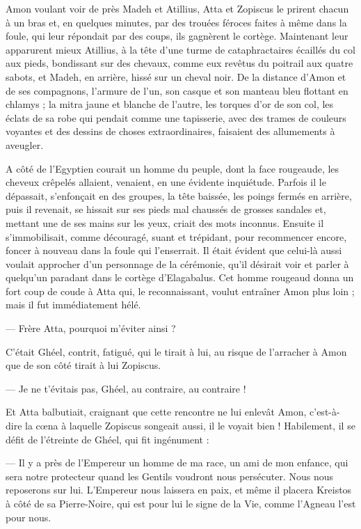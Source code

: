 \documentclass[a4paper, 11pt, oneside, polutonikogreek, french]{article}
\begin{document}
Amon voulant voir de près Madeh et Atillius, Atta et Zopiscus le prirent chacun à un bras et, en quelques minutes, par des trouées féroces faites à même dans la foule, qui leur répondait par des coups, ils gagnèrent le cortège. Maintenant leur apparurent mieux Atillius, à la tête d'une turme de cataphractaires écaillés du col aux pieds, bondissant sur des chevaux, comme eux revêtus du poitrail aux quatre sabots, et Madeh, en arrière, hissé sur un cheval noir. De la distance d'Amon et de ses compagnons, l'armure de l'un, son casque et son manteau bleu flottant en chlamys ; la mitra jaune et blanche de l'autre, les torques d'or de son col, les éclats de sa robe qui pendait comme une tapisserie, avec des trames de couleurs voyantes et des dessins de choses extraordinaires, faisaient des allumements à aveugler.

A côté de l'Egyptien courait un homme du peuple, dont la face rougeaude, les cheveux crêpelés allaient, venaient, en une évidente inquiétude. Parfois il le dépassait, s'enfonçait en des groupes, la tête baissée, les poings fermés en arrière, puis il revenait, se hissait sur ses pieds mal chaussés de grosses sandales et, mettant une de ses mains sur les yeux, criait des mots inconnus. Ensuite il s'immobilisait, comme découragé, suant et trépidant, pour recommencer encore, foncer à nouveau dans la foule qui l'enserrait. Il était évident que celui-là aussi voulait approcher d'un personnage de la cérémonie, qu'il désirait voir et parler à quelqu'un paradant dans le cortège d'Elagabalus. Cet homme rougeaud donna un fort coup de coude à Atta qui, le reconnaissant, voulut entraîner Amon plus loin ; mais il fut immédiatement hélé.

--- Frère Atta, pourquoi m'éviter ainsi ?

C'était Ghéel, contrit, fatigué, qui le tirait à lui, au risque de l'arracher à Amon que de son côté tirait à lui Zopiscus.

--- Je ne t'évitais pas, Ghéel, au contraire, au contraire !

Et Atta balbutiait, craignant que cette rencontre ne lui enlevât Amon, c'est-à-dire la cœna à laquelle Zopiscus songeait aussi, il le voyait bien ! Habilement, il se défit de l'étreinte de Ghéel, qui fit ingénument :

--- Il y a près de l'Empereur un homme de ma race, un ami de mon enfance, qui sera notre protecteur quand les Gentils voudront nous persécuter. Nous nous reposerons sur lui. L'Empereur nous laissera en paix, et même il placera Kreistos à côté de sa Pierre-Noire, qui est pour lui le signe de la Vie, comme l'Agneau l'est pour nous.
\end{document}
